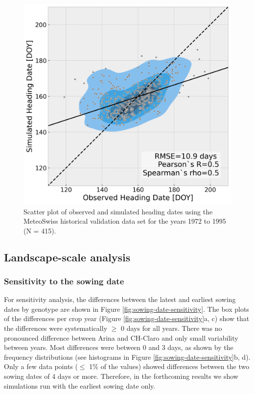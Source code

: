 \begin{figure}[H]
    \centering
    \includegraphics[scale=0.5]{03-Heading-Dates/img/scatter_plot_validation_meteoswiss.png}
    \caption{Scatter plot of observed and simulated heading dates using the MeteoSwiss historical validation data set for the years 1972 to 1995 (N = 415).}
    \label{fig:val-scatter-meteoswiss}
\end{figure}

\subsection{Landscape-scale analysis}

\subsubsection{Sensitivity to the sowing date}
\label{subsubsec:sensitivity}

For sensitivity analysis, the differences between the latest and earliest sowing dates by genotype are shown in Figure \ref{fig:sowing-date-sensitivity}. The box plots of the differences per crop year (Figure \ref{fig:sowing-date-sensitivity}a, c) show that the differences were systematically $\ge$ 0 days for all years. There was no pronounced difference between Arina and CH-Claro and only small variability between years. Most differences were between 0 and 3 days, as shown by the frequency distributions (see histograms in Figure \ref{fig:sowing-date-sensitivity}b, d). Only a few data points ($\le$ 1\% of the values) showed differences between the two sowing dates of 4 days or more. Therefore, in the forthcoming results we show simulations run with the earliest sowing date only.

